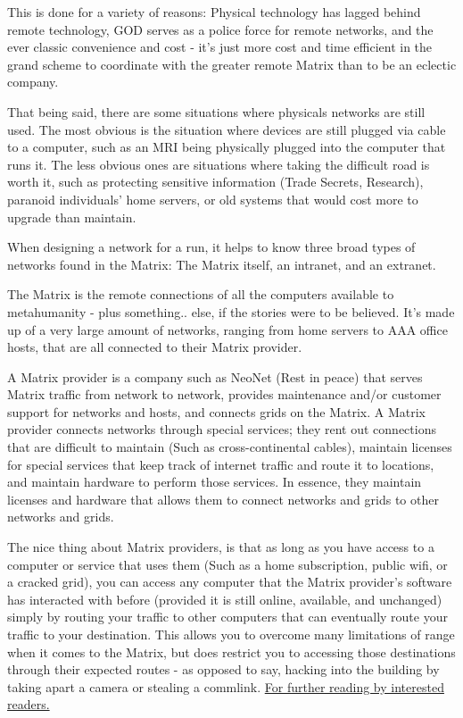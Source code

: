 \begin{multicols}{3}
	This is done for a variety of reasons: Physical technology has lagged behind remote technology, GOD serves as a police force for remote networks, and the ever classic convenience and cost - it's just more cost and time efficient in the grand scheme to coordinate with the greater remote Matrix than to be an eclectic company.
	
	That being said, there are some situations where physicals networks are still used. The most obvious is the situation where devices are still plugged via cable to a computer, such as an MRI being physically plugged into the computer that runs it. The less obvious ones are situations where taking the difficult road is worth it, such as protecting sensitive information (Trade Secrets, Research), paranoid individuals' home servers, or old systems that would cost more to upgrade than maintain.
	
	When designing a network for a run, it helps to know three broad types of networks found in the Matrix: The Matrix itself, an intranet, and an extranet. 
	
	The Matrix is the remote connections of all the computers available to metahumanity - plus something.. else, if the stories were to be believed. It's made up of a very large amount of networks, ranging from home servers to AAA office hosts, that are all connected to their Matrix provider. 
	
	A Matrix provider is a company such as NeoNet (Rest in peace) that serves Matrix traffic from network to network, provides maintenance and/or customer support for networks and hosts, and connects grids on the Matrix. A Matrix provider connects networks through special services; they rent out connections that are difficult to maintain (Such as cross-continental cables), maintain licenses for special services that keep track of internet traffic and route it to locations, and maintain hardware to perform those services. In essence, they maintain licenses and hardware that allows them to connect networks and grids to other networks and grids.
	
	The nice thing about Matrix providers, is that as long as you have access to a computer or service that uses them (Such as a home subscription, public wifi, or a cracked grid), you can access any computer that the Matrix provider's software has interacted with before (provided it is still online, available, and unchanged) simply by routing your traffic to other computers that can eventually route your traffic to your destination. This allows you to overcome many limitations of range when it comes to the Matrix, but does restrict you to accessing those destinations through their expected routes - as opposed to say, hacking into the building by taking apart a camera or stealing a commlink. \textcolor{Blue}{\href{https://blog.thelifeofkenneth.com/2017/11/creating-autonomous-system-for-fun-and.html}{For further reading by interested readers.}}
	

\end{multicols}
